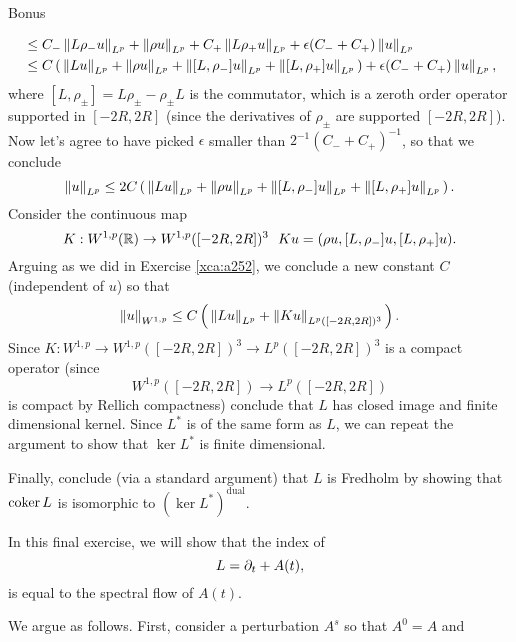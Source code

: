 \documentclass{amsart}
\begin{document}
\begin{clear}{Bonus}
\begin{xca}
\begin{equation*}
\begin{aligned}
      &\le C_{-}\left\lVert L\rho_{-}u\right\rVert_{L^{p}}+\left\lVert\rho
        u\right\rVert_{L^{p}}+C_{+}\left\lVert L\rho_{+}u\right\rVert_{L^{p}}+\epsilon(C_{-}+C_{+})\left\lVert u\right\rVert_{L^{p}}\\
      &\le C\left(\,\left\lVert Lu\right\rVert_{L^{p}}+\left\lVert\rho u\right\rVert_{L^{p}}+\left\lVert[L,\rho_{-}]u\right\rVert_{L^{p}}+\left\lVert[L,\rho_{+}]u\right\rVert_{L^{p}}\,\right)+\epsilon(C_{-}+C_{+})\left\lVert u\right\rVert_{L^{p}},
    \end{aligned}
  \end{equation*}
  where $[L,\rho_{\pm}]=L\rho_{\pm}-\rho_{\pm} L$ is the commutator, which is a zeroth
  order operator supported in $[-2R,2R]$ (since the derivatives of
  $\rho_{\pm}$ are supported $[-2R,2R]$). Now let's agree to have
  picked $\epsilon$ smaller than $2^{-1}(C_{-}+C_{+})^{-1}$, so that
  we conclude
  \begin{equation*}
    \left\lVert u\right\rVert_{L^{p}}\le 2C\left(\,\left\lVert Lu\right\rVert_{L^{p}}+\left\lVert\rho u\right\rVert_{L^{p}}+\left\lVert[L,\rho_{-}]u\right\rVert_{L^{p}}+\left\lVert[L,\rho_{+}]u\right\rVert_{L^{p}}\,\right).
  \end{equation*}
  Consider the continuous map
  \begin{equation*}
    K:W^{1,p}(\R)\to W^{1,p}([-2R,2R])^{3}\ \ Ku=(\rho u, [L,\rho_{-}]u,[L,\rho_{+}]u).
  \end{equation*}
  Arguing as we did in Exercise \ref{xca:a252}, we conclude a new
  constant $C$ (independent of $u$) so that
  \begin{equation*}
    \left\lVert u\right\rVert_{W^{1,p}}\le C\left(\,\left\lVert Lu\right\rVert_{L^{p}}+\left\lVert Ku\right\rVert_{L^{p}([-2R,2R])^{3}}\,\right).
  \end{equation*}
  Since $K:W^{1,p}\to W^{1,p}([-2R,2R])^{3}\to L^{p}([-2R,2R])^{3}$ is
  a compact operator (since $$W^{1,p}([-2R,2R])\to L^{p}([-2R,2R])$$ is
  compact by Rellich compactness) conclude that $L$ has closed image and finite dimensional
  kernel. Since $L^{*}$ is of the same form as $L$, we can repeat the
  argument to show that $\ker L^{*}$ is finite dimensional.

  Finally, conclude (via a standard argument) that $L$ is Fredholm by
  showing that $\operatorname{\mathrm{coker}} L$ is isomorphic to
  $(\ker L^{*})^{\text{dual}}$.
\end{xca}
\begin{xca}
  In this final exercise, we will show that the index of
  \begin{equation*}
    L=\partial_{t}+A(t),
  \end{equation*}
  is equal to the spectral flow of $A(t)$.

  We argue as follows. First, consider a perturbation $A^{s}$ so that
  $A^{0}=A$ and


\end{xca}
\end{clear}
\end{document}
